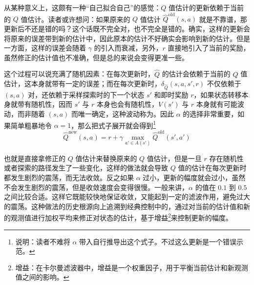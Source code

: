 从某种意义上，这颇有一种“自己拟合自己”的感觉：$Q$ 值估计的更新依赖于当前的 $Q$ 值估计。读者或许想问：如果原来的 $Q$ 值估计 $\hat Q^{\text{old}} (s, a)$ 就是不靠谱，那更新后不还是错的吗？这个话既不完全对，也不完全是错的。确实，这样的更新会将原来的误差带到新的估计中，因此原本的估计不好确实会影响到新的估计。但是一方面，这样的误差会随着 $\gamma$ 的引入而衰减，另外，$r$ 直接地引入了当前的奖励，虽然修正的估计值也不准确，但是总的来说会变得更准一些。

这个过程可以说充满了随机因素：在每次更新时，$\hat Q$ 的估计会依赖于当前的 $Q$ 值估计，这本身就带有一定的误差；而在每次更新时，$\delta_{\hat Q} (s, a, s', r)$ 不仅依赖于 $(s, a)$ 对，还依赖于采样探索时的下一个状态 $s'$ 和即时奖励 $r$，如果状态转移本身就带有随机性，因而 $s'$ 与 $r$ 本身也会有随机性，$V(s')$ 与 $r$ 本身就有可能波动，而非随着 $(s, a)$ 而唯一确定，这种波动称为。因此 $\alpha$ 的选择非常重要，如果简单粗暴地令 $\alpha = 1$，那么把式子展开就会得到\footnote{说明：读者不难将 $\alpha$ 带入自行推导出这个式子。不过这么更新是一个错误示范。}
\[
    \hat Q^{\text{new}} (s, a) = r + \gamma \max_{a' \in A(s')} \hat Q^{\text{old}} (s', a') 
\]

也就是直接拿修正的 $Q$ 值估计来替换原来的 $Q$ 值估计，但是一旦 $r$ 存在随机性或者探索的路径发生了一些变化，这样的做法就会导致 $Q$ 值的估计在每次更新时都发生剧烈的震荡，而无法收敛。反之如果 $\alpha$ 过小，更新的幅度就会过小，虽然不会发生剧烈的震荡，但是收敛速度会变得很慢。一般来讲，$\alpha$ 的值在 $0.1$ 到 $0.5$ 之间比较合适。这样它既能较快地保证收敛，又能起到一定的滤波作用，避免过大的震荡。这种做法的历史根源向上追溯到经典控制中的，通过对当前的估计值和新的观测值进行加权平均来修正对状态的估计，基于增益\footnote{增益：在卡尔曼滤波器中，增益是一个权重因子，用于平衡当前估计和新观测值之间的影响。}来控制更新的幅度。

